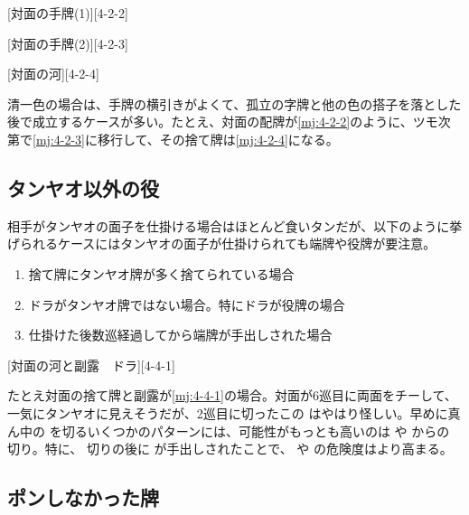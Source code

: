 \documentclass[10pt, twocolumn]{article}
\begin{document}
[対面の手牌(1)][4-2-2]

[対面の手牌(2)][4-2-3]

[対面の河][4-2-4]

清一色の場合は、手牌の横引きがよくて、孤立の字牌と他の色の搭子を落とした後で成立するケースが多い\citep[][pp.~55--57]{takizawa-yomi}。たとえ、対面の配牌が\ref{mj:4-2-2}のように、ツモ次第で\ref{mj:4-2-3}に移行して、その捨て牌は\ref{mj:4-2-4}になる。

\subsection{タンヤオ以外の役}

相手がタンヤオの面子を仕掛ける場合はほとんど食いタンだが、以下のように挙げられるケースにはタンヤオの面子が仕掛けられても端牌や役牌が要注意\citep[][pp.~58--63]{takizawa-yomi}。

\begin{enumerate}
  \item 捨て牌にタンヤオ牌が多く捨てられている場合
  \item ドラがタンヤオ牌ではない場合。特にドラが役牌の場合
  \item 仕掛けた後数巡経過してから端牌が手出しされた場合
\end{enumerate}

[対面の河と副露　ドラ][4-4-1]

たとえ対面の捨て牌と副露が\ref{mj:4-4-1}の場合。対面が6巡目に両面をチーして、一気にタンヤオに見えそうだが、2巡目に切ったこの  はやはり怪しい。早めに真ん中の  を切るいくつかのパターンには、可能性がもっとも高いのは  や  からの  切り。特に、 切りの後に  が手出しされたことで、 や  の危険度はより高まる。

\subsection{ポンしなかった牌}

\begin{rittai}[h]
  \centering
  
  
  \caption{親がドラ  をポンして打 。3巡ツモ切りの後  が出てきた\citep[][p.~70]{takizawa-yomi}}
  \label{rittai:nopon}
\end{rittai}
\end{document}
